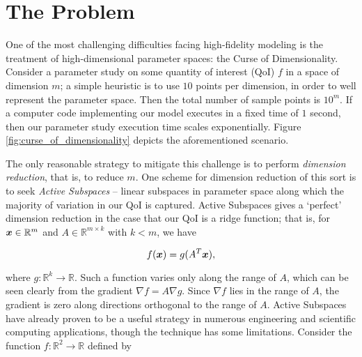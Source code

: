 \documentclass{article}
\begin{document}



\section{The Problem}
One of the most challenging difficulties facing high-fidelity modeling is the treatment of high-dimensional parameter spaces: the Curse of Dimensionality. Consider a parameter study on some quantity of interest (QoI) $f$ in a space of dimension $m$; a simple heuristic is to use $10$ points per dimension, in order to well represent the parameter space. Then the total number of sample points is $10^m$. If a computer code implementing our model executes in a fixed time of $1$ second, then our parameter study execution time scales exponentially. Figure \ref{fig:curse_of_dimensionality} depicts the aforementioned scenario.


The only reasonable strategy to mitigate this challenge is to perform \emph{dimension reduction}, that is, to reduce $m$. One scheme for dimension reduction of this sort is to seek \emph{Active Subspaces} -- linear subspaces in parameter space along which the majority of variation in our QoI is captured. \cite{constantine2015} Active Subspaces gives a `perfect' dimension reduction in the case that our QoI is a ridge function; that is, for $\boldsymbol{x}\in\mathbb{R}^m$ and $A\in\mathbb{R}^{m\times k}$ with $k<m$, we have

\begin{equation}
f(\boldsymbol{x}) = g(A^T\boldsymbol{x}),
\end{equation}

where $g:\mathbb{R}^k\to\mathbb{R}$. Such a function varies only along the range of $A$, which can be seen clearly from the gradient $\nabla f=A\nabla g$. Since $\nabla f$ lies in the range of $A$, the gradient is zero along directions orthogonal to the range of $A$. Active Subspaces have already proven to be a useful strategy in numerous engineering and scientific computing applications, though the technique has some limitations. Consider the function $f:\mathbb{R}^2\to\mathbb{R}$ defined by
\end{document}
